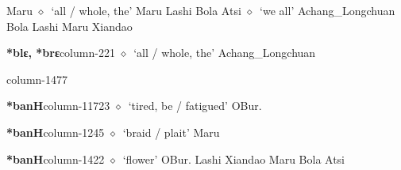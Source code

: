 \hspace{1ex}
         Maru 
\hspace{1ex}
         $\diamond$~`all / whole, the'
         Maru 
\hspace{1ex}
         Lashi 
\hspace{1ex}
         Bola 
\hspace{1ex}
         Atsi 
\hspace{1ex}
         $\diamond$~`we all'
         Achang\_Longchuan 
\hspace{1ex}
         Bola 
\hspace{1ex}
         Lashi 
\hspace{1ex}
         Maru 
\hspace{1ex}
         Xiandao 
  \item {\footnotesize \textbf{*blɛ, *brɛ}}{\tiny column-221}
         $\diamond$~`all / whole, the'
         Achang\_Longchuan 
  \item {\footnotesize \textbf{}}{\tiny column-1477}
  \item {\footnotesize \textbf{*banH}}{\tiny column-11723}
         $\diamond$~`tired, be / fatigued'
         OBur. 
  \item {\footnotesize \textbf{*banH}}{\tiny column-1245}
         $\diamond$~`braid / plait'
         Maru 
  \item {\footnotesize \textbf{*banH}}{\tiny column-1422}
         $\diamond$~`flower'
         OBur. 
\hspace{1ex}
         Lashi 
\hspace{1ex}
         Xiandao 
\hspace{1ex}
         Maru 
\hspace{1ex}
         Bola 
\hspace{1ex}
         Atsi 
